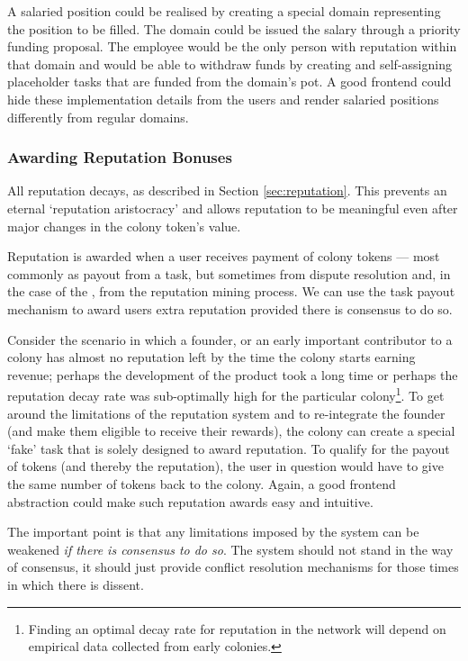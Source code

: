 A salaried position could be realised by creating a special domain representing the position to be filled. The domain could be issued the salary through a priority funding proposal. The employee would be the only person with reputation within that domain and would be able to withdraw funds by creating and self-assigning placeholder tasks that are funded from the domain's pot. A good frontend could hide these implementation details from the users and render salaried positions differently from regular domains.

\subsubsection{Awarding Reputation Bonuses}

All reputation decays, as described in Section \ref{sec:reputation}. This prevents an eternal `reputation aristocracy' and allows reputation to be meaningful even after major changes in the colony token's value. 

Reputation is awarded when a user receives payment of colony tokens --- most commonly as payout from a task, but sometimes from dispute resolution and, in the case of the \rc, from the reputation mining process. We can use the task payout mechanism to award users extra reputation provided there is consensus to do so. 

Consider the scenario in which a founder, or an early important contributor to a colony has almost no reputation left by the time the colony starts earning revenue; perhaps the development of the product took a long time or perhaps the reputation decay rate was sub-optimally high for the particular colony\footnote{Finding an optimal decay rate for reputation in the network will depend on empirical data collected from early colonies.}. To get around the limitations of the reputation system and to re-integrate the founder (and make them eligible to receive their rewards), the colony can create a special `fake' task that is solely designed to award reputation. To qualify for the payout of tokens (and thereby the reputation), the user in question would have to give the same number of tokens back to the colony. Again, a good frontend abstraction could make such reputation awards easy and intuitive.

The important point is that any limitations imposed by the system can be weakened \emph{if there is consensus to do so}. The system should not stand in the way of consensus, it should just provide conflict resolution mechanisms for those times in which there is dissent.


